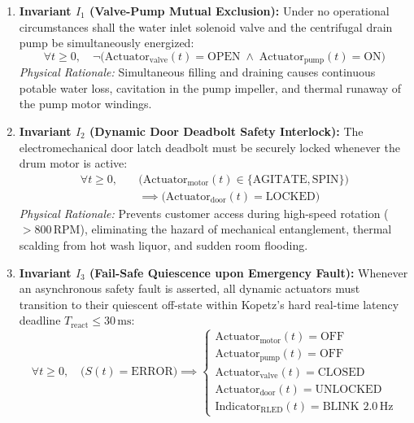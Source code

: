 \begin{enumerate}[leftmargin=*]
  \item \textbf{Invariant $I_1$ (Valve-Pump Mutual Exclusion):}
        Under no operational circumstances shall the water inlet solenoid valve and the centrifugal drain pump
        be simultaneously energized:
        \begin{equation}
          \forall t \ge 0, \quad \neg \Big(\text{Actuator}_{\text{valve}}(t) = \text{OPEN} \;\land\; \text{Actuator}_{\text{pump}}(t) = \text{ON}\Big)
          \label{eq:inv1}
        \end{equation}
        \emph{Physical Rationale:} Simultaneous filling and draining causes continuous potable water loss,
        cavitation in the pump impeller, and thermal runaway of the pump motor windings.

  \item \textbf{Invariant $I_2$ (Dynamic Door Deadbolt Safety Interlock):}
        The electromechanical door latch deadbolt must be securely locked whenever the drum motor is active:
        \begin{equation}
        \begin{split}
          \forall t \ge 0, \quad & \Big(\text{Actuator}_{\text{motor}}(t) \in \{\text{AGITATE}, \text{SPIN}\}\Big) \\
          & \implies \Big(\text{Actuator}_{\text{door}}(t) = \text{LOCKED}\Big)
        \end{split}
        \label{eq:inv2}
        \end{equation}
        \emph{Physical Rationale:} Prevents customer access during high-speed rotation ($>800\,\text{RPM}$),
        eliminating the hazard of mechanical entanglement, thermal scalding from hot wash liquor, and sudden room flooding.

  \item \textbf{Invariant $I_3$ (Fail-Safe Quiescence upon Emergency Fault):}
        Whenever an asynchronous safety fault is asserted, all dynamic actuators must transition to their quiescent
        off-state within Kopetz's hard real-time latency deadline $T_{\text{react}} \le 30\,\text{ms}$:
        \begin{equation}
          \forall t \ge 0, \quad \big(S(t) = \text{ERROR}\big) \implies
          \begin{cases}
            \text{Actuator}_{\text{motor}}(t) = \text{OFF} \\
            \text{Actuator}_{\text{pump}}(t) = \text{OFF} \\
            \text{Actuator}_{\text{valve}}(t) = \text{CLOSED} \\
            \text{Actuator}_{\text{door}}(t) = \text{UNLOCKED} \\
            \text{Indicator}_{\text{RLED}}(t) = \text{BLINK } 2.0\,\text{Hz}
          \end{cases}
          \label{eq:inv3}
        \end{equation}


\end{enumerate}
